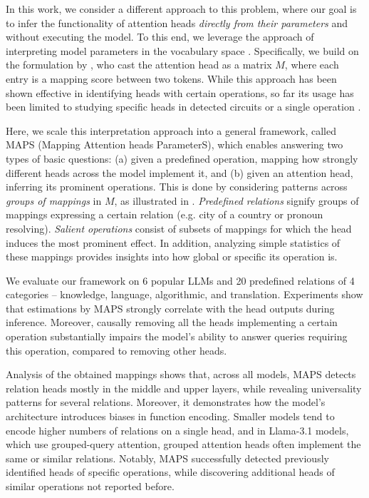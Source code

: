 \documentclass[11pt]{article}
\newcommand{\llama}{Llama-3.1}
\newcommand{\framework}{\textsc{MAPS}}
\begin{document}
In this work, we consider a different approach to this problem, where our goal is to infer the functionality of attention heads \textit{directly from their parameters} and without executing the model.
To this end, we leverage the approach of interpreting model parameters in the vocabulary space \citep{geva-etal-2021-transformer, geva-etal-2022-transformer, katz-etal-2024-backward}. Specifically, we build on the formulation by \citet{elhage2021mathematical,Dar2022AnalyzingTI}, who cast the attention head as a matrix $M$, where each entry is a mapping score between two tokens.
While this approach has been shown effective in identifying heads with certain operations, so far its usage has been limited to studying specific heads in detected circuits \cite{wang2022interpretability, mcdougall-etal-2024-copy} or a single operation \citet{gould2024successor}.

Here, we scale this interpretation approach into a general framework, called \framework{} (Mapping Attention heads ParameterS), which enables answering two types of basic questions: (a) given a predefined operation, mapping how strongly different heads across the model implement it, and (b) given an attention head, inferring its prominent operations. This is done by considering patterns across \textit{groups of mappings} in $M$, as illustrated in . \textit{Predefined relations} signify groups of mappings expressing a certain relation (e.g. city of a country or pronoun resolving). \textit{Salient operations} consist of subsets of mappings for which the head induces the most prominent effect.
In addition, analyzing simple statistics of these mappings provides insights into how global or specific its operation is.

We evaluate our framework on 6 popular LLMs and 20 predefined relations of 4 categories -- knowledge, language, algorithmic, and translation. Experiments show that estimations by \framework{} strongly correlate with the head outputs during inference. Moreover, causally removing all the heads implementing a certain operation substantially impairs the model's ability to answer queries requiring this operation, compared to removing other heads.

Analysis of the obtained mappings shows that, across all models, \framework{} detects relation heads mostly in the middle and upper layers, while revealing universality patterns for several relations.
Moreover, it demonstrates how the model's architecture introduces biases in function encoding. Smaller models tend to encode higher numbers of relations on a single head, and  
in \llama{} models, which use grouped-query attention, grouped attention heads often implement the same or similar relations. 
Notably, \framework{} successfully detected previously identified heads of specific operations, while discovering additional heads of similar operations not reported before.
\end{document}

